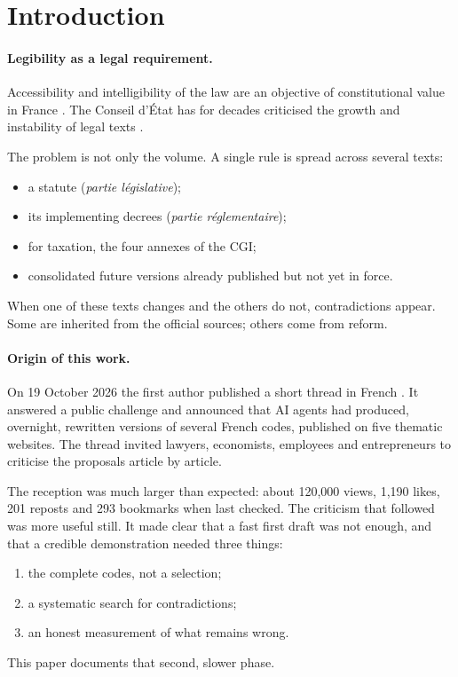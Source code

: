 \documentclass[11pt,a4paper]{article}
\begin{document}
\section{Introduction}

\paragraph{Legibility as a legal requirement.}
Accessibility and intelligibility of the law are an objective of constitutional value in France \cite{cc99421}. The Conseil d'État has for decades criticised the growth and instability of legal texts \cite{ce2016}.

The problem is not only the volume. A single rule is spread across several texts:
\begin{itemize}
  \item a statute (\emph{partie législative});
  \item its implementing decrees (\emph{partie réglementaire});
  \item for taxation, the four annexes of the CGI;
  \item consolidated future versions already published but not yet in force.
\end{itemize}
When one of these texts changes and the others do not, contradictions appear. Some are inherited from the official sources; others come from reform.

\paragraph{Origin of this work.}
On 19 October 2026 the first author published a short thread in French \cite{tweet}. It answered a public challenge and announced that AI agents had produced, overnight, rewritten versions of several French codes, published on five thematic websites. The thread invited lawyers, economists, employees and entrepreneurs to criticise the proposals article by article.

The reception was much larger than expected: about 120{,}000 views, 1{,}190 likes, 201 reposts and 293 bookmarks when last checked. The criticism that followed was more useful still. It made clear that a fast first draft was not enough, and that a credible demonstration needed three things:
\begin{enumerate}[label=(\roman*)]
  \item the complete codes, not a selection;
  \item a systematic search for contradictions;
  \item an honest measurement of what remains wrong.
\end{enumerate}
This paper documents that second, slower phase.
\end{document}
